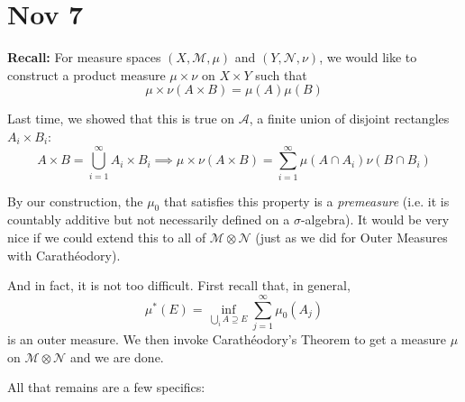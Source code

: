 \documentclass[12pt]{report}
\newcommand{\A}{\mathcal{A}}
\newcommand{\M}{\mathcal{M}}
\newcommand{\Nc}{\mathcal{N}}
\newcommand*{\tbf}[1]{\ifmmode\mathbf{#1}\else\textbf{#1}\fi}
\begin{document}
\section{Nov 7}
    \tbf{Recall:} For measure spaces $(X, \M, \mu)$ and $(Y, \Nc, \nu)$, we would like to construct a product measure $\mu \times \nu$ on $X \times Y$ such that
    \[\mu\times\nu(A \times B) = \mu(A)\mu(B)\]

    Last time, we showed that this is true on $\A$, a finite union of disjoint rectangles $A_i \times B_i$: 
    \[A \times B = \bigcup_{i=1}^\infty A_i \times B_i \implies \mu\times\nu(A \times B) = \sum_{i=1}^\infty \mu(A \cap A_i) \nu(B \cap B_i)\]

    By our construction, the $\mu_0$ that satisfies this property is a \emph{premeasure} (i.e. it is countably additive but not necessarily defined on a $\sigma$-algebra). It would be very nice if we could extend this to all of $\M \otimes \Nc$ (just as we did for Outer Measures with Carathéodory).

    And in fact, it is not too difficult. First recall that, in general,
    \[\mu^*(E) = \inf_{\bigcup_i A \supseteq E} \sum_{j=1}^\infty \mu_0(A_j)\]
    is an outer measure. We then invoke Carathéodory's Theorem to get a measure $\mu$ on $\M \otimes \Nc$ and we are done.

    All that remains are a few specifics:
\end{document}
